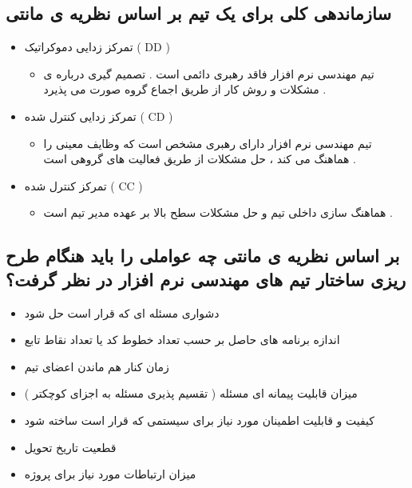 \documentclass{article}
\begin{document}
\subsection{سازماندهی کلی برای یک تیم بر اساس نظریه ی مانتی}


\begin{itemize}
	\item تمرکز زدایی دموکراتیک ( DD )
	\begin{itemize}
		\item تیم مهندسی نرم افزار فاقد رهبری دائمی است . تصمیم گیری درباره ی مشکلات و روش کار از طریق اجماع گروه صورت می پذیرد .
	\end{itemize}
	\item تمرکز زدایی کنترل شده ( CD )
	\begin{itemize}
		\item تیم مهندسی نرم افزار دارای رهبری مشخص است که وظایف معینی را هماهنگ می کند ، حل مشکلات از طریق فعالیت های گروهی است . 
	\end{itemize}
	\item تمرکز کنترل شده ( CC )
	\begin{itemize}
		\item هماهنگ سازی داخلی تیم و حل مشکلات سطح بالا بر عهده مدیر تیم است .
	\end{itemize}
\end{itemize}


\newpage

\subsection{بر اساس نظریه ی مانتی چه عواملی را باید هنگام طرح ریزی ساختار تیم های مهندسی نرم افزار در نظر گرفت؟}


\begin{itemize}
	\item دشواری مسئله ای که قرار است حل شود
	\item اندازه برنامه های حاصل بر حسب تعداد خطوط کد یا تعداد نقاط تابع
	\item زمان کنار هم ماندن اعضای تیم
	\item میزان قابلیت پیمانه ای مسئله ( تقسیم  پذیری مسئله به اجزای کوچکتر )
	\item کیفیت و قابلیت اطمینان مورد نیاز برای سیستمی که قرار است ساخته شود
	\item قطعیت تاریخ تحویل
	\item میزان ارتباطات مورد نیاز برای پروژه
\end{itemize}
\end{document}
